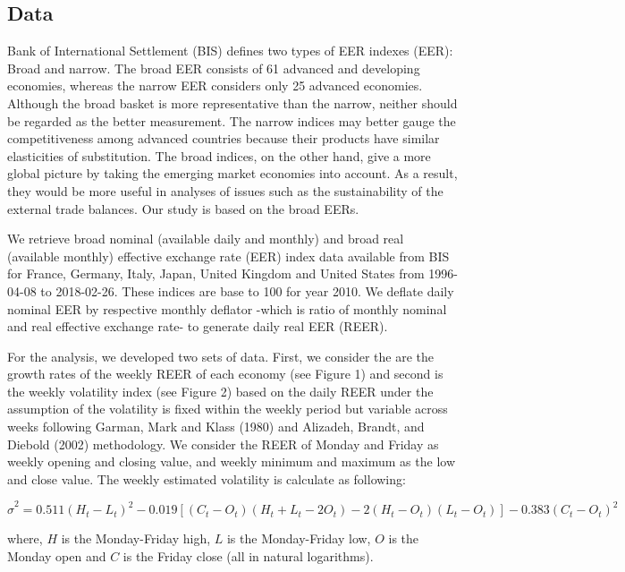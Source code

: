 \documentclass[]{elsarticle} %
\begin{document}
\subsection{\texorpdfstring{\textbf{Data}}{Data}}\label{data}

Bank of International Settlement (BIS) defines two types of EER indexes
(EER): Broad and narrow. The broad EER consists of 61 advanced and
developing economies, whereas the narrow EER considers only 25 advanced
economies. Although the broad basket is more representative than the
narrow, neither should be regarded as the better measurement. The narrow
indices may better gauge the competitiveness among advanced countries
because their products have similar elasticities of substitution. The
broad indices, on the other hand, give a more global picture by taking
the emerging market economies into account. As a result, they would be
more useful in analyses of issues such as the sustainability of the
external trade balances. Our study is based on the broad EERs.

We retrieve broad nominal (available daily and monthly) and broad real
(available monthly) effective exchange rate (EER) index data available
from BIS for France, Germany, Italy, Japan, United Kingdom and United
States from 1996-04-08 to 2018-02-26. These indices are base to 100 for
year 2010. We deflate daily nominal EER by respective monthly deflator
-which is ratio of monthly nominal and real effective exchange rate- to
generate daily real EER (REER).

For the analysis, we developed two sets of data. First, we consider the
are the growth rates of the weekly REER of each economy (see Figure 1)
and second is the weekly volatility index (see Figure 2) based on the
daily REER under the assumption of the volatility is fixed within the
weekly period but variable across weeks following Garman, Mark and Klass
(1980) and Alizadeh, Brandt, and Diebold (2002) methodology. We consider
the REER of Monday and Friday as weekly opening and closing value, and
weekly minimum and maximum as the low and close value. The weekly
estimated volatility is calculate as following:

\[{{\hat{\sigma }}^{2}}=0.511{{\left( {{H}_{t}}-{{L}_{t}} \right)}^{2}}-0.019\left[ \left( {{C}_{t}}-{{O}_{t}} \right)\left( {{H}_{t}}+{{L}_{t}}-2{{O}_{t}} \right)-2\left( {{H}_{t}}-{{O}_{t}} \right)\left( {{L}_{t}}-{{O}_{t}} \right) \right]-0.383{{\left( {{C}_{t}}-{{O}_{t}} \right)}^{2}}\]

where, \(H\) is the Monday-Friday high, \(L\) is the Monday-Friday low,
\(O\) is the Monday open and \(C\) is the Friday close (all in natural
logarithms).
\end{document}
